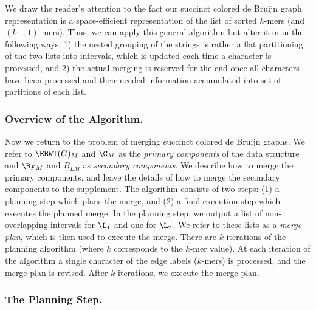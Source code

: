 We draw the reader's attention to the fact our succinct colored de Bruijn graph representation is a space-efficient representation of the list of sorted $k$-mers (and $(k - 1)$-mers).  Thus, we can apply this general algorithm but alter it in in the following ways: 1) the nested grouping of the strings is rather a flat partitioning of the two lists into intervals, which is updated each time a character is processed, and 2) the actual merging is reserved for the end once all characters have been processed and their needed information accumulated into set of partitions of each list.

\subsubsection*{Overview of the Algorithm.}

Now we return to the problem of merging succinct colored de Bruijn graphs.  We refer to $\EBWT(G)_M$ and $\C_M$ as the {\em primary components} of the data structure and $\B_{FM}$ and $B_{LM}$ as {\em secondary components}.  We describe how to merge the primary components, and leave the details of how to merge the secondary components to the supplement.   The algorithm consists of two steps: (1) a planning step which plans the merge, and (2) a final execution step which executes the planned merge. In the planning step, we output a list of non-overlapping intervals for $\L_{1}$ and one for $\L_{2}$.  We refer to these lists as a {\em merge plan}, which is then used to execute the merge.  There are $k$ iterations of the planning algorithm (where $k$ corresponds to the $k$-mer value).  At each iteration of the algorithm a single character of the edge labels ($k$-mers) is processed, and the merge plan is revised. After $k$ iterations, we execute the merge plan.


\subsubsection*{The Planning Step.}  

